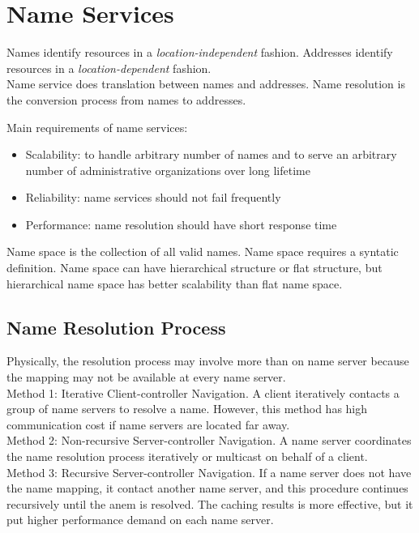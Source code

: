 \chapter{Name Services}
\begin{multicols*}{2}

\noindent Names identify resources in a \emph{location-independent} fashion. Addresses identify resources in a \emph{location-dependent} fashion.\\

\noindent Name service does translation between names and addresses. Name resolution is the conversion process from names to addresses. 

\noindent Main requirements of name services:
\begin{itemize}
  \item Scalability: to handle arbitrary number of names and to serve an arbitrary number of administrative organizations over long lifetime
  \item Reliability: name services should not fail frequently
  \item Performance: name resolution should have short response time
\end{itemize}

\noindent Name space is the collection of all valid names. Name space requires a syntatic definition. Name space can have hierarchical structure or flat structure, but hierarchical name space has better scalability than flat name space.

\section{Name Resolution Process}

\noindent Physically, the resolution process may involve more than on name server because the mapping may not be available at every name server.\\

\noindent Method 1: Iterative Client-controller Navigation. A client iteratively contacts a group of name servers to resolve a name. However, this method has high communication cost if name servers are located far away.\\

\noindent Method 2: Non-recursive Server-controller Navigation. A name server coordinates the name resolution process iteratively or multicast on behalf of a client.\\

\noindent Method 3: Recursive Server-controller Navigation. If a name server does not have the name mapping, it contact another name server, and this procedure continues recursively until the anem is resolved. The caching results is more effective, but it put higher performance demand on each name server.


\end{multicols*}
